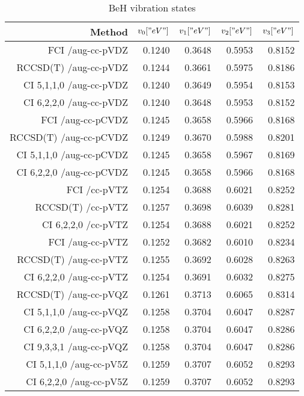 \begin{table}[]
\centering
\caption{BeH vibration states}
\label{TODO}
\begin{tabular}{rrrrr}
\toprule
Method & $v_0 [" eV"]$ & $v_1 [" eV"]$ & $v_2 [" eV"]$ & $v_3[" eV"]$ \\ \midrule
    FCI  /aug-cc-pVDZ & 0.1240 & 0.3648 & 0.5953 & 0.8152\\
RCCSD(T)  /aug-cc-pVDZ & 0.1244 & 0.3661 & 0.5975 & 0.8186\\
CI 5,1,1,0 /aug-cc-pVDZ & 0.1240 & 0.3649 & 0.5954 & 0.8153\\
CI 6,2,2,0 /aug-cc-pVDZ & 0.1240 & 0.3648 & 0.5953 & 0.8152\\
FCI  /aug-cc-pCVDZ & 0.1245 & 0.3658 & 0.5966 & 0.8168\\
RCCSD(T)  /aug-cc-pCVDZ & 0.1249 & 0.3670 & 0.5988 & 0.8201\\
CI 5,1,1,0 /aug-cc-pCVDZ & 0.1245 & 0.3658 & 0.5967 & 0.8169\\
CI 6,2,2,0 /aug-cc-pCVDZ & 0.1245 & 0.3658 & 0.5966 & 0.8168\\
FCI  /cc-pVTZ & 0.1254 & 0.3688 & 0.6021 & 0.8252\\
RCCSD(T)  /cc-pVTZ & 0.1257 & 0.3698 & 0.6039 & 0.8281\\
CI 6,2,2,0 /cc-pVTZ & 0.1254 & 0.3688 & 0.6021 & 0.8252\\
FCI  /aug-cc-pVTZ & 0.1252 & 0.3682 & 0.6010 & 0.8234\\
RCCSD(T)  /aug-cc-pVTZ & 0.1255 & 0.3692 & 0.6028 & 0.8263\\
CI 6,2,2,0 /aug-cc-pVTZ & 0.1254 & 0.3691 & 0.6032 & 0.8275\\
RCCSD(T)  /aug-cc-pVQZ & 0.1261 & 0.3713 & 0.6065 & 0.8314\\
CI 5,1,1,0 /aug-cc-pVQZ & 0.1258 & 0.3704 & 0.6047 & 0.8287\\
CI 6,2,2,0 /aug-cc-pVQZ & 0.1258 & 0.3704 & 0.6047 & 0.8286\\
CI 9,3,3,1 /aug-cc-pVQZ & 0.1258 & 0.3704 & 0.6047 & 0.8286\\
CI 5,1,1,0 /aug-cc-pV5Z & 0.1259 & 0.3707 & 0.6052 & 0.8293\\
CI 6,2,2,0 /aug-cc-pV5Z & 0.1259 & 0.3707 & 0.6052 & 0.8293\\
\bottomrule
\end{tabular}
\end{table}
    